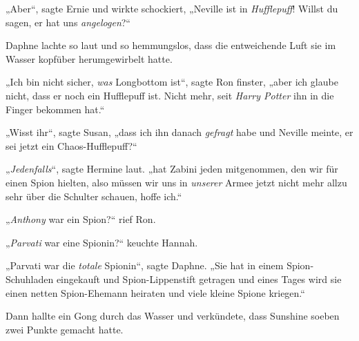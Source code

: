 „Aber“, sagte Ernie und wirkte schockiert,
„Neville ist in \emph{Hufflepuff}! Willst du sagen, er hat uns \emph{angelogen}?“

Daphne lachte so laut und so hemmungslos, dass die entweichende Luft sie im Wasser kopfüber herumgewirbelt hatte.

„Ich bin nicht sicher, \emph{was} Longbottom ist“, sagte Ron finster, „aber ich glaube nicht, dass er noch ein Hufflepuff ist. Nicht mehr, seit \emph{Harry Potter} ihn in die Finger bekommen hat.“

„Wisst ihr“, sagte Susan, „dass ich ihn danach \emph{gefragt} habe und Neville meinte, er sei jetzt ein Chaos-Hufflepuff?“

„\emph{Jedenfalls}“, sagte Hermine laut. „hat Zabini jeden mitgenommen, den wir für einen Spion hielten, also müssen wir uns in \emph{unserer} Armee jetzt nicht mehr allzu sehr über die Schulter schauen, hoffe ich.“

„\emph{Anthony} war ein Spion?“ rief Ron.

„\emph{Parvati} war eine Spionin?“ keuchte Hannah.

„Parvati war die \emph{totale} Spionin“, sagte Daphne.
„Sie hat in einem Spion-Schuhladen eingekauft und Spion-Lippenstift getragen und eines Tages wird sie einen netten Spion-Ehemann heiraten und viele kleine Spione kriegen.“

Dann hallte ein Gong durch das Wasser und verkündete, dass Sunshine soeben zwei Punkte gemacht hatte.

